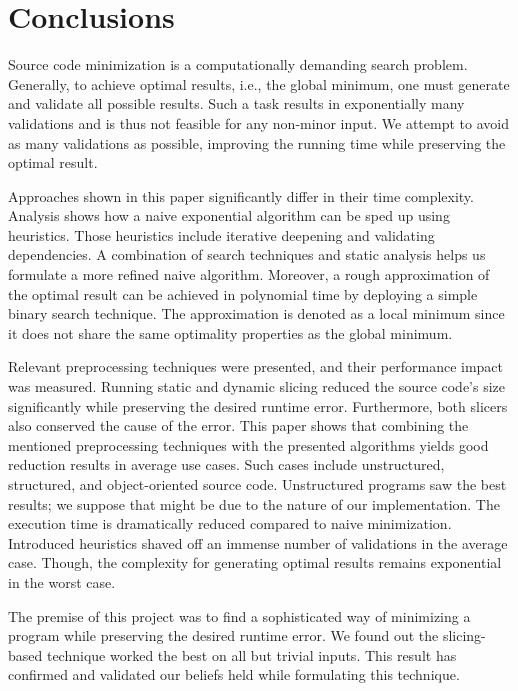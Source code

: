 \chapter{Conclusions}


Source code minimization is a computationally demanding search problem. 
Generally, to achieve optimal results, i.e., the global minimum, one must 
generate and validate all possible results. 
Such a task results in exponentially many validations and is thus not feasible 
for any non-minor input. 
We attempt to avoid as many validations as possible, improving the running 
time while preserving the optimal result.

Approaches shown in this paper significantly differ in their time complexity. 
Analysis shows how a naive exponential algorithm can be sped up using 
heuristics. Those heuristics include iterative deepening and validating 
dependencies. 
A combination of search techniques and static analysis helps us formulate 
a more refined naive algorithm. 
Moreover, a rough approximation of the optimal result can be achieved 
in polynomial time by deploying a simple binary search technique. 
The approximation is denoted as a local minimum since it does not share 
the same optimality properties as the global minimum.

Relevant preprocessing techniques were presented, and their performance impact 
was measured. 
Running static and dynamic slicing reduced the source code's size 
significantly while preserving the desired runtime error. 
Furthermore, both slicers also conserved the cause of the error.
This paper shows that combining the mentioned preprocessing techniques with 
the presented algorithms yields good reduction results in average use cases. 
Such cases include unstructured, structured, and object-oriented source code. 
Unstructured programs saw the best results; we suppose that might be due to 
the nature of our implementation. 
The execution time is dramatically reduced compared to naive minimization. 
Introduced heuristics shaved off an immense number of validations in 
the average case. 
Though, the complexity for generating optimal results remains exponential in 
the worst case.

The premise of this project was to find a sophisticated way of minimizing 
a program while preserving the desired runtime error. 
We found out the slicing-based technique worked the best on all but trivial 
inputs. 
This result has confirmed and validated our beliefs held while formulating 
this technique.

